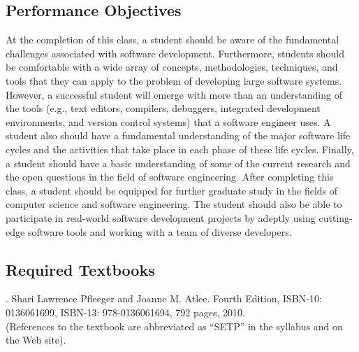 \subsection*{Performance Objectives}

At the completion of this class, a student should be aware of the fundamental challenges associated with software
development.  Furthermore, students should be comfortable with a wide array of concepts, methodologies, techniques, and
tools that they can apply to the problem of developing large software systems.  However, a successful student will
emerge with more than an understanding of the tools (e.g., text editors, compilers, debuggers, integrated development
environments, and version control systems) that a software engineer uses.  A student also should have a fundamental
understanding of the major software life cycles and the activities that take place in each phase of these life cycles.
Finally, a student should have a basic understanding of some of the current research and the open questions in the field
of software engineering.  After completing this class, a student should be equipped for further graduate study in the
fields of computer science and software engineering.  The student should also be able to participate in real-world
software development projects by adeptly using cutting-edge software tools and working with a team of diverse
developers.

\subsection*{Required Textbooks}


. Shari Lawrence Pfleeger and Joanne M. Atlee.
Fourth Edition, ISBN-10: 0136061699, ISBN-13: 978-0136061694, 792 pages, 2010. \\
(References to the textbook are abbreviated as ``SETP'' in the syllabus and on the Web site).


